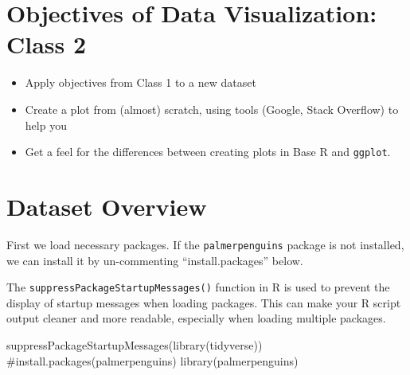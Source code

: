 \documentclass[
  letterpaper,
  DIV=11,
  numbers=noendperiod]{scrreprt}
\newenvironment{Shaded}{\begin{snugshade}}{\end{snugshade}}
\newcommand{\CommentTok}[1]{\textcolor[rgb]{0.37,0.37,0.37}{#1}}
\newcommand{\FunctionTok}[1]{\textcolor[rgb]{0.28,0.35,0.67}{#1}}
\newcommand{\NormalTok}[1]{\textcolor[rgb]{0.00,0.23,0.31}{#1}}
\begin{document}
\section{Objectives of Data Visualization: Class
2}\label{objectives-of-data-visualization-class-2}

\begin{itemize}
\item
  Apply objectives from Class 1 to a new dataset
\item
  Create a plot from (almost) scratch, using tools (Google, Stack
  Overflow) to help you
\item
  Get a feel for the differences between creating plots in Base R and
  \texttt{ggplot}.
\end{itemize}

\section{Dataset Overview}\label{dataset-overview}

First we load necessary packages. If the \texttt{palmerpenguins} package
is not installed, we can install it by un-commenting
``install.packages'' below.

\begin{tcolorbox}[enhanced jigsaw, bottomtitle=1mm, bottomrule=.15mm, toprule=.15mm, opacityback=0, leftrule=.75mm, breakable, colback=white, toptitle=1mm, left=2mm, coltitle=black, titlerule=0mm, opacitybacktitle=0.6, title=\textcolor{quarto-callout-tip-color}{\faLightbulb}\hspace{0.5em}{Tip -- Suppress Package Startup Messages}, rightrule=.15mm, arc=.35mm, colframe=quarto-callout-tip-color-frame, colbacktitle=quarto-callout-tip-color!10!white]

The \texttt{suppressPackageStartupMessages()} function in R is used to
prevent the display of startup messages when loading packages. This can
make your R script output cleaner and more readable, especially when
loading multiple packages.

\end{tcolorbox}

\begin{Shaded}
\begin{Highlighting}[]
\FunctionTok{suppressPackageStartupMessages}\NormalTok{(}\FunctionTok{library}\NormalTok{(tidyverse))}
\CommentTok{\#install.packages(\textquotesingle{}palmerpenguins\textquotesingle{})}
\FunctionTok{library}\NormalTok{(palmerpenguins)}
\end{Highlighting}
\end{Shaded}
\end{document}
